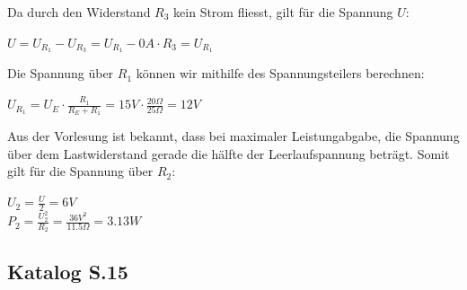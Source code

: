 Da durch den Widerstand $R_3$ kein Strom fliesst, gilt für die Spannung $U$:
\begin{center}
  $ U = U_{R_1} - U_{R_3} = U_{R_1} - 0A \cdot R_3 = U_{R_1}$
\end{center}
Die Spannung über $R_1$ können wir mithilfe des Spannungsteilers berechnen: \\
\begin{center}
  $U_{R_1} = U_E \cdot \frac{R_1}{R_E + R_1} = 15V \cdot \frac{20\Omega}{25\Omega} = 12V$
\end{center}
Aus der Vorlesung ist bekannt, dass bei maximaler Leistungabgabe, die Spannung über dem Lastwiderstand gerade die hälfte der Leerlaufspannung beträgt. Somit gilt für die Spannung über $R_2$:
\begin{center}
  $U_2 = \frac{U}{2} = 6V $ \\
  $P_2 = \frac{U_2^2}{R_2} = \frac{36V^2}{11.5\Omega} = 3.13W$
\end{center}





\newpage



\subsection{Katalog S.15}


